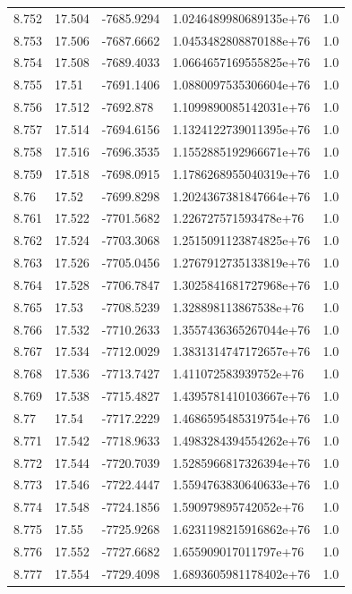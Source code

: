\begin{tabular}{lllll}
8.752 & 17.504 & -7685.9294 & 1.0246489980689135e+76 & 1.0 \\
8.753 & 17.506 & -7687.6662 & 1.0453482808870188e+76 & 1.0 \\
8.754 & 17.508 & -7689.4033 & 1.0664657169555825e+76 & 1.0 \\
8.755 & 17.51 & -7691.1406 & 1.0880097535306604e+76 & 1.0 \\
8.756 & 17.512 & -7692.878 & 1.1099890085142031e+76 & 1.0 \\
8.757 & 17.514 & -7694.6156 & 1.1324122739011395e+76 & 1.0 \\
8.758 & 17.516 & -7696.3535 & 1.1552885192966671e+76 & 1.0 \\
8.759 & 17.518 & -7698.0915 & 1.1786268955040319e+76 & 1.0 \\
8.76 & 17.52 & -7699.8298 & 1.2024367381847664e+76 & 1.0 \\
8.761 & 17.522 & -7701.5682 & 1.226727571593478e+76 & 1.0 \\
8.762 & 17.524 & -7703.3068 & 1.2515091123874825e+76 & 1.0 \\
8.763 & 17.526 & -7705.0456 & 1.2767912735133819e+76 & 1.0 \\
8.764 & 17.528 & -7706.7847 & 1.3025841681727968e+76 & 1.0 \\
8.765 & 17.53 & -7708.5239 & 1.328898113867538e+76 & 1.0 \\
8.766 & 17.532 & -7710.2633 & 1.3557436365267044e+76 & 1.0 \\
8.767 & 17.534 & -7712.0029 & 1.3831314747172657e+76 & 1.0 \\
8.768 & 17.536 & -7713.7427 & 1.411072583939752e+76 & 1.0 \\
8.769 & 17.538 & -7715.4827 & 1.4395781410103667e+76 & 1.0 \\
8.77 & 17.54 & -7717.2229 & 1.4686595485319754e+76 & 1.0 \\
8.771 & 17.542 & -7718.9633 & 1.4983284394554262e+76 & 1.0 \\
8.772 & 17.544 & -7720.7039 & 1.5285966817326394e+76 & 1.0 \\
8.773 & 17.546 & -7722.4447 & 1.5594763830640633e+76 & 1.0 \\
8.774 & 17.548 & -7724.1856 & 1.590979895742052e+76 & 1.0 \\
8.775 & 17.55 & -7725.9268 & 1.6231198215916862e+76 & 1.0 \\
8.776 & 17.552 & -7727.6682 & 1.655909017011797e+76 & 1.0 \\
8.777 & 17.554 & -7729.4098 & 1.6893605981178402e+76 & 1.0 \\

\end{tabular}
